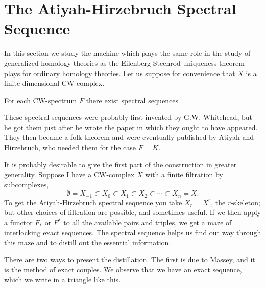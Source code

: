 \documentclass[../main]{subfiles}
\begin{document}
\label{sec:p3c07}


\chapter{The Atiyah-Hirzebruch Spectral Sequence}
In this section we study the machine which plays the same role in the study of generalized homology theories as the Eilenberg-Steenrod uniqueness theorem plays for ordinary homology theories. Let us suppose for convenience that $X$ is a finite-dimensional CW-complex.


\begin{theorem*}
For each CW-spectrum $F$ there exist spectral sequences 
\begin{center}
\end{center}
\end{theorem*}

These spectral sequences were probably first invented by G.W. Whitehead, but he got them just after he wrote the paper \plscite{[18]} in which they ought to have appeared. They then became a folk-theorem and were eventually published by Atiyah and Hirzebruch, who needed them for the case $F=K$.

It is probably desirable to give the first part of the construction in greater generality. Suppose I have a CW-complex $X$ with a finite filtration by subcomplexes,
\begin{equation*}
    \emptyset=X_{-1}\subset X_0\subset X_1\subset X_2\subset\cdots\subset X_n=X.
\end{equation*}
To get the Atiyah-Hirzebruch spectral sequence you take $X_r=X^r$, the $r$-skeleton; but other choices of filtration are possible, and sometimes useful. If we then apply a functor $F_{\ast}$ or $F^{\ast}$ to all the available pairs and triples, we get a maze of interlocking exact sequences. The spectral sequence helps us find out way through this maze and to distill out the essential information.

There are two ways to present the distillation. The first is due to Massey, and it is the method of exact couples. We observe that we have an exact sequence, which we write in a triangle like this.
\begin{center}
\end{center}
\end{document}
